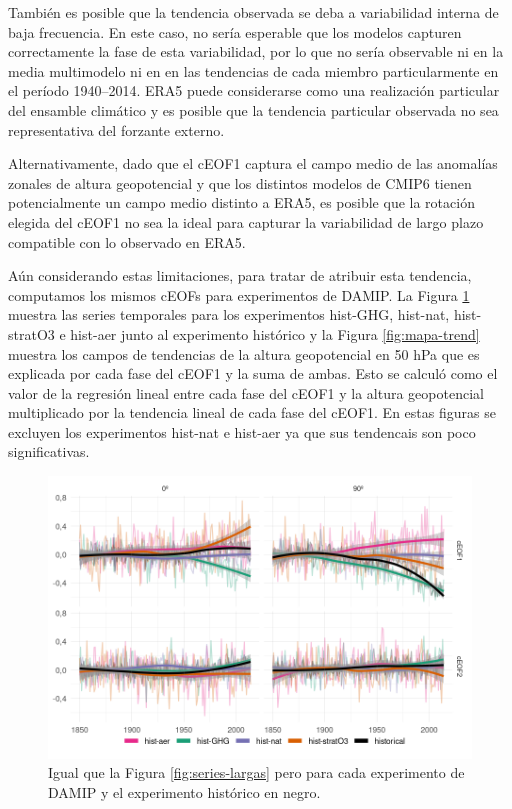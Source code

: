 \documentclass[12pt,oneside,a4paper]{reedthesis}
\begin{document}
También es posible que la tendencia observada se deba a variabilidad interna de baja frecuencia.
En este caso, no sería esperable que los modelos capturen correctamente la fase de esta variabilidad, por lo que no sería observable ni en la media multimodelo ni en en las tendencias de cada miembro particularmente en el período 1940--2014.
ERA5 puede considerarse como una realización particular del ensamble climático y es posible que la tendencia particular observada no sea representativa del forzante externo.

Alternativamente, dado que el cEOF1 captura el campo medio de las anomalías zonales de altura geopotencial y que los distintos modelos de CMIP6 tienen potencialmente un campo medio distinto a ERA5, es posible que la rotación elegida del cEOF1 no sea la ideal para capturar la variabilidad de largo plazo compatible con lo observado en ERA5.

Aún considerando estas limitaciones, para tratar de atribuir esta tendencia, computamos los mismos cEOFs para experimentos de DAMIP.
La Figura \ref{fig:ceof-damip} muestra las series temporales para los experimentos hist-GHG, hist-nat, hist-stratO3 e hist-aer junto al experimento histórico y la Figura \ref{fig:mapa-trend} muestra los campos de tendencias de la altura geopotencial en 50 hPa que es explicada por cada fase del cEOF1 y la suma de ambas.
Esto se calculó como el valor de la regresión lineal entre cada fase del cEOF1 y la altura geopotencial multiplicado por la tendencia lineal de cada fase del cEOF1.
En estas figuras se excluyen los experimentos hist-nat e hist-aer ya que sus tendencais son poco significativas.

\begin{figure}

{\centering \includegraphics{figures/50-cmip6/ceof-damip-1} 

}

\caption{Igual que la Figura \ref{fig:series-largas} pero para cada experimento de DAMIP y el experimento histórico en negro.}\label{fig:ceof-damip}
\end{figure}
\end{document}

